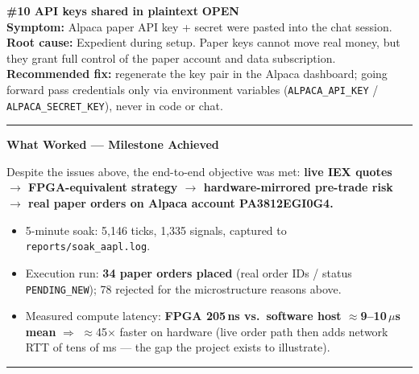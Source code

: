 \documentclass[10pt,a4paper]{article}
\newcommand{\openi}{\textcolor{badred}{\textbf{OPEN}}}
\newcommand{\sectionrule}{\vspace{2pt}\textcolor{rulegray}{\rule{\linewidth}{0.8pt}}\vspace{2pt}}
\begin{document}
\begin{issuebox}
\textbf{\#10 \quad API keys shared in plaintext} \hfill \openi\\
\textbf{Symptom:} Alpaca paper API key + secret were pasted into the chat
session.\\
\textbf{Root cause:} Expedient during setup. Paper keys cannot move real money,
but they grant full control of the paper account and data subscription.\\
\textbf{Recommended fix:} regenerate the key pair in the Alpaca dashboard; going
forward pass credentials only via environment variables
(\texttt{ALPACA\_API\_KEY} / \texttt{ALPACA\_SECRET\_KEY}), never in code or chat.
\end{issuebox}

\sectionrule

{\large\bfseries\color{hdrblue} What Worked --- Milestone Achieved}

\begin{keybox}
Despite the issues above, the end-to-end objective was met: \textbf{live IEX
quotes \(\rightarrow\) FPGA-equivalent strategy \(\rightarrow\) hardware-mirrored
pre-trade risk \(\rightarrow\) real paper orders on Alpaca account PA3812EGI0G4.}

\smallskip
\begin{itemize}[leftmargin=1.4em,topsep=2pt,itemsep=1pt]
\item 5-minute soak: 5{,}146 ticks, 1{,}335 signals, captured to
      \texttt{reports/soak\_aapl.log}.
\item Execution run: \textbf{34 paper orders placed} (real order IDs / status
      \texttt{PENDING\_NEW}); 78 rejected for the microstructure reasons above.
\item Measured compute latency: \textbf{FPGA 205\,ns vs.\ software host
      \(\approx\)9--10\,\(\mu\)s mean} \(\Rightarrow\) \(\approx\)45\(\times\)
      faster on hardware (live order path then adds network RTT of tens of ms ---
      the gap the project exists to illustrate).
\end{itemize}
\end{keybox}

\sectionrule
\end{document}
